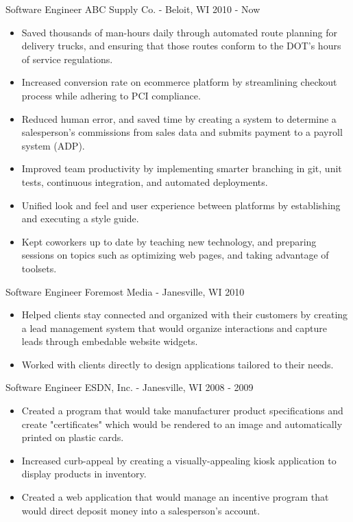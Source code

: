 \documentclass[]{clean-resume}
\begin{document}
\entry
	{Software Engineer}
	{ABC Supply Co. - Beloit, WI}
	{2010 - Now}
	{
		\begin{itemize}
			\item Saved thousands of man-hours daily through automated route planning for delivery trucks, and ensuring that those routes conform to the DOT's hours of service regulations.
		
			\item Increased conversion rate on ecommerce platform by streamlining checkout process while adhering to PCI compliance.
			
			\item Reduced human error, and saved time by creating a system to determine a salesperson's commissions from sales data and submits payment to a payroll system (ADP).
		
			\item Improved team productivity by implementing smarter branching in git, unit tests, continuous integration, and automated deployments.
		
			\item Unified look and feel and user experience between platforms by establishing and executing a style guide.
		
			\item Kept coworkers up to date by teaching new technology, and preparing sessions on topics such as optimizing web pages, and taking advantage of toolsets.
		\end{itemize}
		
	}

\entry
	{Software Engineer}
	{Foremost Media - Janesville, WI}
	{2010}
	{
		\begin{itemize}
			\item Helped clients stay connected and organized with their customers by creating a lead management system that would organize interactions and capture leads through embedable website widgets.
			\item Worked with clients directly to design applications tailored to their needs.
		\end{itemize}
		
	}
	
\entry
	{Software Engineer}
	{ESDN, Inc. - Janesville, WI}
	{2008 - 2009}
	{
		\begin{itemize}
			\item Created a program that would take manufacturer product specifications and create "certificates" which would be rendered to an image and automatically printed on plastic cards.
			\item Increased curb-appeal by creating a visually-appealing kiosk application to display products in inventory.
			\item Created a web application that would manage an incentive program that would direct deposit money into a salesperson's account.
		\end{itemize}
		
	}
\end{document}
